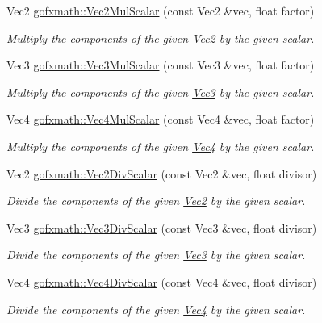 \begin{DoxyCompactItemize}
Vec2 \hyperlink{group___s_i_s_d_vec_math_ga8e4fd4586284706a28625b0fca6c85e7}{gofxmath\+::\+Vec2\+Mul\+Scalar} (const Vec2 \&vec, float factor)
\begin{DoxyCompactList}\small\item\em Multiply the components of the given \hyperlink{classgofxmath_1_1_vec2}{Vec2} by the given scalar. \end{DoxyCompactList}\item 
Vec3 \hyperlink{group___s_i_s_d_vec_math_ga79475199c50b1ee42edc6aa8b5c5795f}{gofxmath\+::\+Vec3\+Mul\+Scalar} (const Vec3 \&vec, float factor)
\begin{DoxyCompactList}\small\item\em Multiply the components of the given \hyperlink{classgofxmath_1_1_vec3}{Vec3} by the given scalar. \end{DoxyCompactList}\item 
Vec4 \hyperlink{group___s_i_s_d_vec_math_ga70441f2888f0df752fe0624a5a7b362d}{gofxmath\+::\+Vec4\+Mul\+Scalar} (const Vec4 \&vec, float factor)
\begin{DoxyCompactList}\small\item\em Multiply the components of the given \hyperlink{classgofxmath_1_1_vec4}{Vec4} by the given scalar. \end{DoxyCompactList}\item 
Vec2 \hyperlink{group___s_i_s_d_vec_math_ga8686be4c3f0ee27b05363661fb75a228}{gofxmath\+::\+Vec2\+Div\+Scalar} (const Vec2 \&vec, float divisor)
\begin{DoxyCompactList}\small\item\em Divide the components of the given \hyperlink{classgofxmath_1_1_vec2}{Vec2} by the given scalar. \end{DoxyCompactList}\item 
Vec3 \hyperlink{group___s_i_s_d_vec_math_ga8c2d0c0b9d70b417e598489374ef1f88}{gofxmath\+::\+Vec3\+Div\+Scalar} (const Vec3 \&vec, float divisor)
\begin{DoxyCompactList}\small\item\em Divide the components of the given \hyperlink{classgofxmath_1_1_vec3}{Vec3} by the given scalar. \end{DoxyCompactList}\item 
Vec4 \hyperlink{group___s_i_s_d_vec_math_ga670f1f6ebdadeaa2f656f153218fdee8}{gofxmath\+::\+Vec4\+Div\+Scalar} (const Vec4 \&vec, float divisor)
\begin{DoxyCompactList}\small\item\em Divide the components of the given \hyperlink{classgofxmath_1_1_vec4}{Vec4} by the given scalar. \end{DoxyCompactList}\item 

\end{DoxyCompactItemize}
